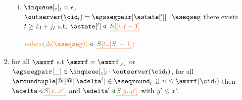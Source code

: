 \begin{definition}
\begin{enumerate}
\begin{enumerate}[i.]
     \item ${\inclient}_l = \epsilon$,  $\outserver(\cid_l) = \agssegpair[{\astate[']}]\cdot \aseqseg$ there exists $t \geq \tknown_l+\treceivebuffer_l $ s.t.
		      $\astate['] \triangleleft \ \flatten{\queuemessage[0 .. t - 1]}$ %
     
       		$\ireduce{\igetdeltas{\aseqseg}}\triangleleft \ \flatten{ \queuemessage[t..|\queuemessage| - 1]}$;
    \end{enumerate}	
	
        \item \label{prop_deltas} for all $\amxrf$ s.t $\amxrf = \amxrf[_s]$ or $\agssegpair[\_]\in\inclient_l\cdot\outserver(\cid_l)$, %
		for all $\aroundtuple[@][@][\adelta'] \in\pending_l$
        if $\irounds\leq\amxrf(\cid_l)$ then $\adelta\triangleleft \flatten{\queuemessage[x..x']}$ and  $\adelta'\triangleleft \flatten{\queuemessage[y..y']}$
        with $y'\leq x'$.
    

\end{enumerate}
	
\end{definition}


